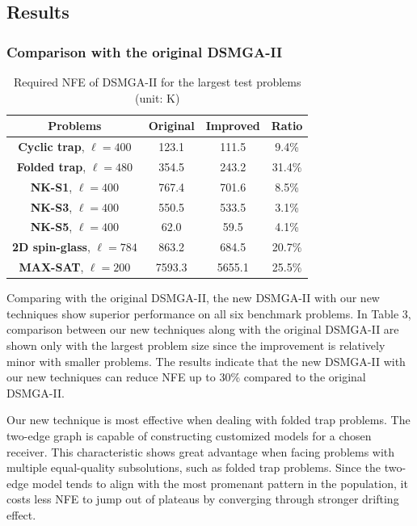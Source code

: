 \documentclass{sig-alternate-05-2015}
\begin{document}
\subsection{Results}

\subsubsection{ Comparison with the original DSMGA-II }

\begin{table}[ht]
\centering
\begin{tabular}{ |c|c|c|c| } \hline
\textbf{Problems}& \textbf{Original} & \textbf{Improved} & \textbf{Ratio}\\ \hline
\textbf{Cyclic trap}, $\ell = 400$ 		& 123.1&111.5&9.4\%\\ \hline
\textbf{Folded trap}, $\ell = 480$	 	& 354.5& 243.2&31.4\%\\ \hline
\textbf{NK-S1}, $\ell = 400$ 				& 767.4& 701.6&8.5\%\\ \hline
\textbf{NK-S3}, $\ell = 400$ 				& 550.5& 533.5&3.1\%\\ \hline
\textbf{NK-S5}, $\ell = 400$ 				& 62.0& 59.5&4.1\%\\ \hline
\textbf{2D spin-glass}, $\ell = 784$ 	& 863.2&684.5&20.7\%\\ \hline
\textbf{MAX-SAT}, $\ell = 200$ 			& 7593.3& 5655.1&25.5\%\\ \hline
\end{tabular}
\caption{Required NFE of DSMGA-II for the largest test problems (unit: K)}
\end{table}

Comparing with the original DSMGA-II, the new DSMGA-II with our new techniques show superior performance on all six benchmark problems.
In Table 3, comparison between our new techniques along with the original DSMGA-II are shown only with the largest problem size since the improvement is relatively minor with smaller problems. 
The results indicate that the new DSMGA-II with our new techniques can reduce NFE up to 30\% compared to the original DSMGA-II. 


Our new technique is most effective when dealing with folded trap problems.
The two-edge graph is capable of constructing customized models for a chosen receiver. 
This characteristic shows great advantage when facing problems with multiple equal-quality subsolutions, such as folded trap problems.
Since the two-edge model tends to align with the most promenant pattern in the population, it costs less NFE to jump out of plateaus by converging through stronger drifting effect.
\end{document}
